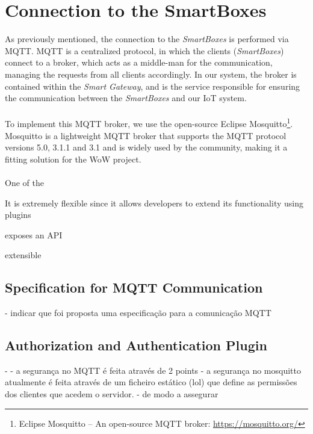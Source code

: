 \section{Connection to the SmartBoxes}

As previously mentioned, the connection to the \textit{SmartBoxes} is performed via \acs{MQTT}. \acs{MQTT} is a centralized protocol, in which the clients (\textit{SmartBoxes}) connect to a broker, which acts as a middle-man for the communication, managing the requests from all clients accordingly. In our system, the broker is contained within the \textit{Smart Gateway}, and is the service responsible for ensuring the communication between the \textit{SmartBoxes} and our \acs{IoT} system.

\paragraph{} To implement this \acs{MQTT} broker, we use the open-source Eclipse Mosquitto\footnote{Eclipse Mosquitto -- An open-source \acs{MQTT} broker: \url{https://mosquitto.org/}}. Mosquitto is a lightweight \acs{MQTT} broker that supports the \acs{MQTT} protocol versions 5.0, 3.1.1 and 3.1 and is widely used by the community, making it a fitting solution for the \acs{WoW} project.

\paragraph{} One of the 



It is extremely flexible since it allows developers to extend its functionality using plugins

exposes an \acs{API}

extensible 

\paragraph{} 


\subsection{Specification for \acs{MQTT} Communication}
- indicar que foi proposta uma especificação para a comunicação MQTT

\subsection{Authorization and Authentication Plugin}
- 
- a segurança no MQTT é feita através de 2 points
- a segurança no mosquitto atualmente é feita através de um ficheiro estático (lol) que define as permissões dos clientes que acedem o servidor.
- de modo a assegurar 

